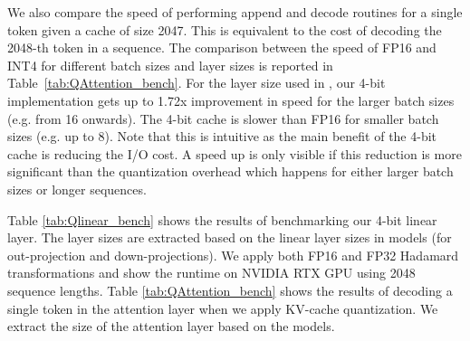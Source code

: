 We also compare the speed of performing append and decode routines for a single token given a cache of size 2047. This is equivalent to the cost of decoding the 2048-th token in a sequence. The comparison between the speed of FP16 and INT4 for different batch sizes and layer sizes is reported in Table~\ref{tab:QAttention_bench}. For the layer size used in \llamaSmall, our 4-bit implementation gets up to 1.72x improvement in speed for the larger batch sizes (e.g. from 16 onwards). The 4-bit cache is slower than FP16 for smaller batch sizes (e.g. up to 8). Note that this is intuitive as the main benefit of the 4-bit cache is reducing the I/O cost. A speed up is only visible if this reduction is more significant than the quantization overhead which happens for either larger batch sizes or longer sequences. 




Table \ref{tab:Qlinear_bench} shows the results of benchmarking our 4-bit linear layer. The layer sizes are extracted based on the linear layer sizes in \llama models (for out-projection and down-projections). We apply both FP16 and FP32 Hadamard transformations and show the runtime on NVIDIA RTX GPU using 2048 sequence lengths. Table \ref{tab:QAttention_bench} shows the results of decoding a single token in the attention layer when we apply KV-cache quantization. We extract the size of the attention layer based on the \llama models. 



